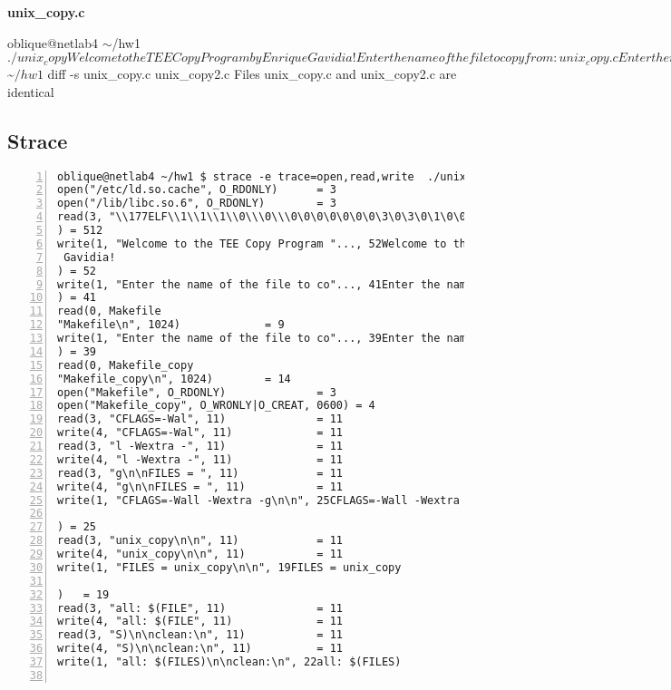 \documentclass[12pt]{article}
\newcommand {\filename}[1] {\flushleft \textbf{#1}}
\newcommand {\mytilde} {$\sim$}
\begin{document}
\filename{unix\_copy.c}
\begin{shelloutput}
oblique@netlab4 \mytilde/hw1 $ ./unix_copy
Welcome to the TEE Copy Program by Enrique Gavidia!
Enter the name of the file to copy from:
unix_copy.c
Enter the name of the file to copy to:
unix_copy2.c


oblique@netlab4 \mytilde/hw1 $ diff -s unix_copy.c unix_copy2.c
Files unix_copy.c and unix_copy2.c are identical
\end{shelloutput}

\subsection*{Strace}
\begin{lstlisting}[numbers=left, breaklines=true, basicstyle=\scriptsize]
oblique@netlab4 ~/hw1 $ strace -e trace=open,read,write  ./unix_copy
open("/etc/ld.so.cache", O_RDONLY)      = 3
open("/lib/libc.so.6", O_RDONLY)        = 3
read(3, "\\177ELF\\1\\1\\1\\0\\\0\\\0\0\0\0\0\0\0\3\0\3\0\1\0\0\0\200\242\1\0004\0\0\0"..., 512
) = 512
write(1, "Welcome to the TEE Copy Program "..., 52Welcome to the TEE Copy Program by Enrique
 Gavidia!
) = 52
write(1, "Enter the name of the file to co"..., 41Enter the name of the file to copy from:
) = 41
read(0, Makefile
"Makefile\n", 1024)             = 9
write(1, "Enter the name of the file to co"..., 39Enter the name of the file to copy to:
) = 39
read(0, Makefile_copy
"Makefile_copy\n", 1024)        = 14
open("Makefile", O_RDONLY)              = 3
open("Makefile_copy", O_WRONLY|O_CREAT, 0600) = 4
read(3, "CFLAGS=-Wal", 11)              = 11
write(4, "CFLAGS=-Wal", 11)             = 11
read(3, "l -Wextra -", 11)              = 11
write(4, "l -Wextra -", 11)             = 11
read(3, "g\n\nFILES = ", 11)            = 11
write(4, "g\n\nFILES = ", 11)           = 11
write(1, "CFLAGS=-Wall -Wextra -g\n\n", 25CFLAGS=-Wall -Wextra -g

) = 25
read(3, "unix_copy\n\n", 11)            = 11
write(4, "unix_copy\n\n", 11)           = 11
write(1, "FILES = unix_copy\n\n", 19FILES = unix_copy

)   = 19
read(3, "all: $(FILE", 11)              = 11
write(4, "all: $(FILE", 11)             = 11
read(3, "S)\n\nclean:\n", 11)           = 11
write(4, "S)\n\nclean:\n", 11)          = 11
write(1, "all: $(FILES)\n\nclean:\n", 22all: $(FILES)


\end{lstlisting}
\end{document}
